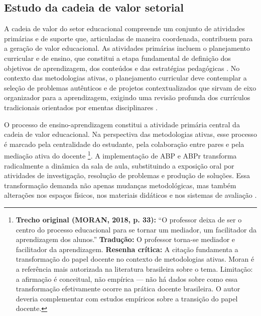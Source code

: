 \subsection{Estudo da cadeia de valor setorial}
\label{subsec:cadeia_valor}

A cadeia de valor do setor educacional compreende um conjunto de atividades primárias e de suporte que, articuladas de maneira coordenada, contribuem para a geração de valor educacional. As atividades primárias incluem o planejamento curricular e de ensino, que constitui a etapa fundamental de definição dos objetivos de aprendizagem, dos conteúdos e das estratégias pedagógicas \cite{BRASIL2018}. No contexto das metodologias ativas, o planejamento curricular deve contemplar a seleção de problemas autênticos e de projetos contextualizados que sirvam de eixo organizador para a aprendizagem, exigindo uma revisão profunda dos currículos tradicionais orientados por ementas disciplinares \cite{COSTA2020}.

O processo de ensino-aprendizagem constitui a atividade primária central da cadeia de valor educacional. Na perspectiva das metodologias ativas, esse processo é marcado pela centralidade do estudante, pela colaboração entre pares e pela mediação ativa do docente \cite{MORAN2018}\footnote{\textbf{Trecho original (MORAN, 2018, p. 33):} ``O professor deixa de ser o centro do processo educacional para se tornar um mediador, um facilitador da aprendizagem dos alunos.'' \textbf{Tradução:} O professor torna-se mediador e facilitador da aprendizagem. \textbf{Resenha crítica:} A citação fundamenta a transformação do papel docente no contexto de metodologias ativas. Moran é a referência mais autorizada na literatura brasileira sobre o tema. Limitação: a afirmação é conceitual, não empírica — não há dados sobre como essa transformação efetivamente ocorre na prática docente brasileira. O autor deveria complementar com estudos empíricos sobre a transição do papel docente.}. A implementação de ABP e ABPr transforma radicalmente a dinâmica da sala de aula, substituindo a exposição oral por atividades de investigação, resolução de problemas e produção de soluções. Essa transformação demanda não apenas mudanças metodológicas, mas também alterações nos espaços físicos, nos materiais didáticos e nos sistemas de avaliação \cite{BACICH2018}.


